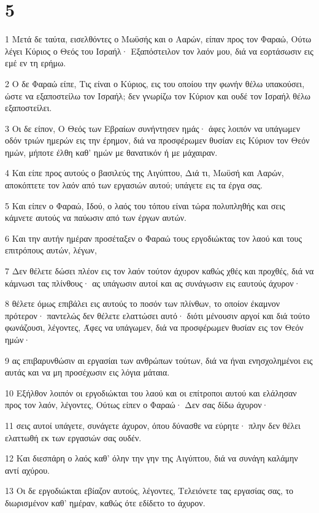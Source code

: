 \chapter{5}

\par 1 Μετά δε ταύτα, εισελθόντες ο Μωϋσής και ο Ααρών, είπαν προς τον Φαραώ, Ούτω λέγει Κύριος ο Θεός του Ισραήλ· Εξαπόστειλον τον λαόν μου, διά να εορτάσωσιν εις εμέ εν τη ερήμω.
\par 2 Ο δε Φαραώ είπε, Τις είναι ο Κύριος, εις του οποίου την φωνήν θέλω υπακούσει, ώστε να εξαποστείλω τον Ισραήλ; δεν γνωρίζω τον Κύριον και ουδέ τον Ισραήλ θέλω εξαποστείλει.
\par 3 Οι δε είπον, Ο Θεός των Εβραίων συνήντησεν ημάς· άφες λοιπόν να υπάγωμεν οδόν τριών ημερών εις την έρημον, διά να προσφέρωμεν θυσίαν εις Κύριον τον Θεόν ημών, μήποτε έλθη καθ' ημών με θανατικόν ή με μάχαιραν.
\par 4 Και είπε προς αυτούς ο βασιλεύς της Αιγύπτου, Διά τι, Μωϋσή και Ααρών, αποκόπτετε τον λαόν από των εργασιών αυτού; υπάγετε εις τα έργα σας.
\par 5 Και είπεν ο Φαραώ, Ιδού, ο λαός του τόπου είναι τώρα πολυπληθής και σεις κάμνετε αυτούς να παύωσιν από των έργων αυτών.
\par 6 Και την αυτήν ημέραν προσέταξεν ο Φαραώ τους εργοδιώκτας τον λαού και τους επιτρόπους αυτών, λέγων,
\par 7 Δεν θέλετε δώσει πλέον εις τον λαόν τούτον άχυρον καθώς χθές και προχθές, διά να κάμνωσι τας πλίνθους· ας υπάγωσιν αυτοί και ας συνάγωσιν εις εαυτούς άχυρον·
\par 8 θέλετε όμως επιβάλει εις αυτούς το ποσόν των πλίνθων, το οποίον έκαμνον πρότερον· παντελώς δεν θέλετε ελαττώσει αυτό· διότι μένουσιν αργοί και διά τούτο φωνάζουσι, λέγοντες, Άφες να υπάγωμεν, διά να προσφέρωμεν θυσίαν εις τον Θεόν ημών·
\par 9 ας επιβαρυνθώσιν αι εργασίαι των ανθρώπων τούτων, διά να ήναι ενησχολημένοι εις αυτάς και να μη προσέχωσιν εις λόγια μάταια.
\par 10 Εξήλθον λοιπόν οι εργοδιώκται του λαού και οι επίτροποι αυτού και ελάλησαν προς τον λαόν, λέγοντες, Ούτως είπεν ο Φαραώ· Δεν σας δίδω άχυρον·
\par 11 σεις αυτοί υπάγετε, συνάγετε άχυρον, όπου δύνασθε να εύρητε· πλην δεν θέλει ελαττωθή εκ των εργασιών σας ουδέν.
\par 12 Και διεσπάρη ο λαός καθ' όλην την γην της Αιγύπτου, διά να συνάγη καλάμην αντί αχύρου.
\par 13 Οι δε εργοδιώκται εβίαζον αυτούς, λέγοντες, Τελειόνετε τας εργασίας σας, το διωρισμένον καθ' ημέραν, καθώς ότε εδίδετο το άχυρον.
